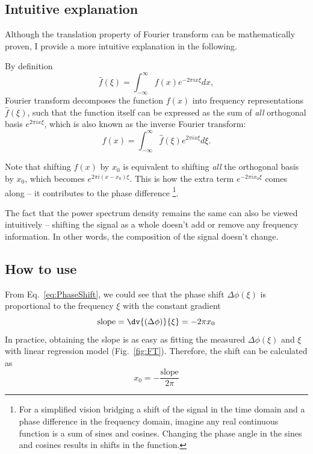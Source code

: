 \subsection{Intuitive explanation}

Although the translation property of Fourier transform can be mathematically proven, I provide a more 
intuitive explanation in the following. 

By definition
\begin{equation}
	\hat{f}(\xi) = \int_{-\infty}^{\infty} f(x) e^{-2 \pi ix \xi} dx, 
\label{eq:FT3}
\end{equation}
Fourier transform decomposes the function $f(x)$ into frequency representations $\hat{f}(\xi)$, such that the function itself can be  
expressed as the sum of \textit{all} orthogonal basis $e^{2 \pi ix \xi}$, which is also known as the inverse Fourier transform:
\begin{equation}
	f(x) = \int_{-\infty}^{\infty} \hat{f}(\xi) e^{2 \pi ix \xi} d\xi. 
\end{equation}

Note that shifting $f(x)$ by $x_0$ is equivalent to shifting \textit{all} the orthogonal basis by $x_0$, which becomes 
$e^{2 \pi i(x-x_0) \xi}$. This is how the extra term $e^{-2 \pi ix_0 \xi}$ comes along -- it contributes to the phase difference 
\footnote{For a simplified vision bridging a shift of the signal in the time domain and a phase difference in the frequency domain, imagine any real continuous function is a sum of sines and cosines. Changing the phase angle in the sines and cosines results in shifts in the function.}.

The fact that the power spectrum density remains the same can also be viewed intuitively -- shifting the signal as a whole 
doesn't add or remove any frequency information. In other words, the composition of the signal doesn't change. 


\subsection{How to use}

From Eq.~\ref{eq:PhaseShift}, we could see that the phase shift $\Delta \phi(\xi)$ is proportional to the frequency $\xi$
with the constant gradient
\begin{equation}
	\text{slope} = \dv{(\Delta \phi)}{\xi} = -2 \pi x_0
\label{eq:gradient}
\end{equation}
In practice, obtaining the slope is as easy as fitting the measured $\Delta \phi(\xi)$ and $\xi$ 
with linear regression model (Fig.~\ref{fig:FT}). Therefore, the shift can be calculated as 
\begin{equation}
	x_0 = -\frac{\text{slope}}{2 \pi}
\label{eq:line_shift}
\end{equation}

